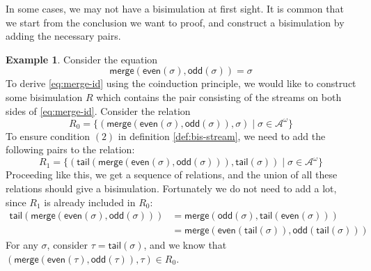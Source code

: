 \documentclass{article}
\newcommand{\alphA}{\mathcal{A}}
\newcommand{\odd}{\mathsf{odd}}
\newcommand{\even}{\mathsf{even}}
\newcommand{\merge}{\mathsf{merge}}
\newcommand{\tail}{\mathsf{tail}}
\theoremstyle{definition}
\theoremstyle{definition}
\newtheorem{example}[theorem]{Example}
\begin{document}
In some cases, we may not have a bisimulation at first sight. It is common that we start from the conclusion we want to proof, and construct a bisimulation by adding the necessary pairs.
\begin{example}
Consider the equation
    \begin{equation}\label{eq:merge-id}
        \merge(\even(\sigma), \odd(\sigma)) = \sigma 
    \end{equation}
To derive \eqref{eq:merge-id} using the coinduction principle, we would like to construct some bisimulation $R$ which contains the pair consisting of the streams on both sides of \eqref{eq:merge-id}. Consider the relation 
    \[
    R_0 = \{ (\merge(\even(\sigma), \odd(\sigma)), \sigma) \mid \sigma\in \alphA^\omega \}
    \]
To ensure condition $(2)$ in definition \ref{def:bis-stream}, we need to add the following pairs to the relation:
    \[
    R_1 = \{ (\tail(\merge(\even(\sigma), \odd(\sigma))), \tail(\sigma)) \mid \sigma\in \alphA^\omega \}
    \]
Proceeding like this, we get a sequence of relations, and the union of all these relations should give a bisimulation. Fortunately we do not need to add a lot, since $R_1$ is already included in $R_0$:
\begin{align*}
    \tail(\merge (\even(\sigma), \odd(\sigma)) ) & = \merge( \odd(\sigma), \tail(\even(\sigma)) ) \\
    & = \merge( \even (\tail(\sigma)), \odd(\tail(\sigma)) )
\end{align*}
For any $\sigma$, consider $\tau = \tail(\sigma)$, and we know that $(\merge(\even(\tau),\odd(\tau)), \tau )\in R_0$.
\end{example}
\end{document}
